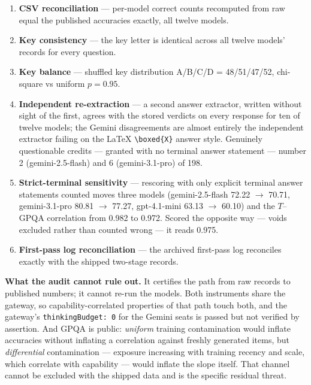 \documentclass{article}
\providecommand{\tightlist}{\setlength{\itemsep}{0pt}\setlength{\parskip}{0pt}}
\begin{document}
\begin{enumerate}
\def\labelenumi{\arabic{enumi}.}
\tightlist
\item
  \textbf{CSV reconciliation} --- per-model correct counts recomputed from raw equal the published accuracies exactly, all twelve models.
\item
  \textbf{Key consistency} --- the key letter is identical across all twelve models' records for every question.
\item
  \textbf{Key balance} --- shuffled key distribution A/B/C/D = 48/51/47/52, chi-square vs uniform \(p = 0.95\).
\item
  \textbf{Independent re-extraction} --- a second answer extractor, written without sight of the first, agrees with the stored verdicts on every response for ten of twelve models; the Gemini disagreements are almost entirely the independent extractor failing on the LaTeX \texttt{\textbackslash{}boxed\{X\}} answer style. Genuinely questionable credits --- granted with no terminal answer statement --- number 2 (gemini-2.5-flash) and 6 (gemini-3.1-pro) of 198.
\item
  \textbf{Strict-terminal sensitivity} --- rescoring with only explicit terminal answer statements counted moves three models (gemini-2.5-flash 72.22 \ensuremath{\rightarrow} 70.71, gemini-3.1-pro 80.81 \ensuremath{\rightarrow} 77.27, gpt-4.1-mini 63.13 \ensuremath{\rightarrow} 60.10) and the \(T\)--GPQA correlation from 0.982 to 0.972. Scored the opposite way --- voids excluded rather than counted wrong --- it reads 0.975.
\item
  \textbf{First-pass log reconciliation} --- the archived first-pass log reconciles exactly with the shipped two-stage records.
\end{enumerate}

\textbf{What the audit cannot rule out.} It certifies the path from raw records to published numbers; it cannot re-run the models. Both instruments share the gateway, so capability-correlated properties of that path touch both, and the gateway's \texttt{thinkingBudget:\ 0} for the Gemini seats is passed but not verified by assertion. And GPQA is public: \emph{uniform} training contamination would inflate accuracies without inflating a correlation against freshly generated items, but \emph{differential} contamination --- exposure increasing with training recency and scale, which correlate with capability --- would inflate the slope itself. That channel cannot be excluded with the shipped data and is the specific residual threat.
\end{document}
